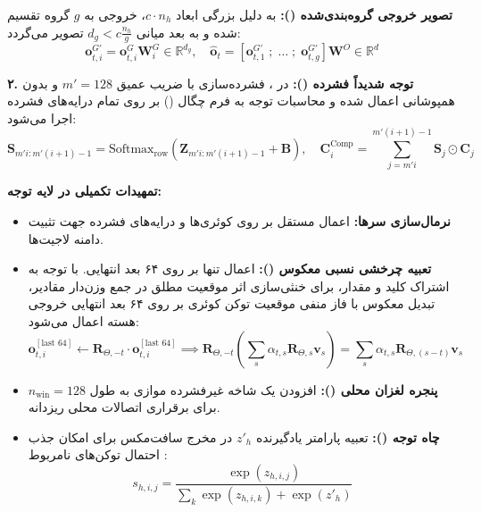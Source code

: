 \textbf{تصویر خروجی گروه‌بندی‌شده ():}
به دلیل بزرگی ابعاد $c \cdot n_h$، خروجی به $g$ گروه تقسیم شده و به بعد میانی $d_g < c \frac{n_h}{g}$ تصویر می‌گردد:
\begin{equation}
    \mathbf{o}_{t,i}^{G'} = \mathbf{o}_{t,i}^G \mathbf{W}_i^G \in \mathbb{R}^{d_g}, \quad \hat{\mathbf{o}}_t = \left[\mathbf{o}_{t,1}^{G'} \;;\; \dots \;;\; \mathbf{o}_{t,g}^{G'}\right] \mathbf{W}^O \in \mathbb{R}^d
\end{equation}

\textbf{۲. توجه شدیداً فشرده ():}
در ، فشرده‌سازی با ضریب عمیق $m'=128$ و بدون همپوشانی اعمال شده و محاسبات توجه به فرم چگال () بر روی تمام درایه‌های فشرده اجرا می‌شود:
\begin{equation}
    \mathbf{S}_{m'i:m'(i+1)-1} = \text{Softmax}_{\text{row}}(\mathbf{Z}_{m'i:m'(i+1)-1} + \mathbf{B}), \quad \mathbf{C}_i^{\text{Comp}} = \sum_{j=m'i}^{m'(i+1)-1} \mathbf{S}_j \odot \mathbf{C}_j
\end{equation}

\textbf{تمهیدات تکمیلی در لایه توجه:}
\begin{itemize}
    \item \textbf{نرمال‌سازی  سرها:} اعمال مستقل بر روی کوئری‌ها و درایه‌های فشرده جهت تثبیت دامنه لاجیت‌ها.
    \item \textbf{تعبیه چرخشی نسبی معکوس ():} اعمال  \cite{su2024roformer} تنها بر روی ۶۴ بعد انتهایی. با توجه به اشتراک کلید و مقدار، برای خنثی‌سازی اثر موقعیت مطلق در جمع وزن‌دار مقادیر، تبدیل معکوس با فاز منفی موقعیت توکن کوئری بر روی ۶۴ بعد انتهایی خروجی هسته اعمال می‌شود:
    \begin{equation}
        \mathbf{o}_{t,i}^{[\text{last 64}]} \leftarrow \mathbf{R}_{\Theta, -t} \cdot \mathbf{o}_{t,i}^{[\text{last 64}]} \implies \mathbf{R}_{\Theta, -t} \left(\sum_s \alpha_{t,s} \mathbf{R}_{\Theta, s} \mathbf{v}_s\right) = \sum_s \alpha_{t,s} \mathbf{R}_{\Theta, (s-t)} \mathbf{v}_s
    \end{equation}
    \item \textbf{پنجره لغزان محلی ():} افزودن یک شاخه غیرفشرده موازی به طول $n_{\text{win}}=128$ برای برقراری اتصالات محلی ریزدانه.
    \item \textbf{چاه توجه ():} تعبیه پارامتر یادگیرنده $z'_h$ در مخرج سافت‌مکس برای امکان جذب احتمال توکن‌های نامربوط \cite{xiao2024efficient}:
    \begin{equation}
        s_{h,i,j} = \frac{\exp(z_{h,i,j})}{\sum_k \exp(z_{h,i,k}) + \exp(z'_h)}
    \end{equation}
\end{itemize}

